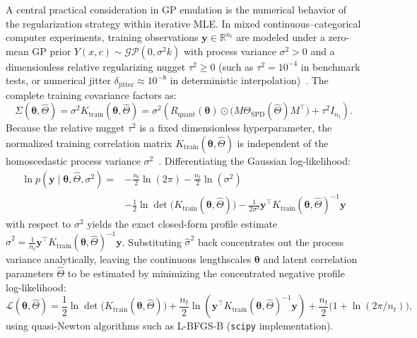 \documentclass[default,sn-mathphys,Numbered]{sn-jnl}
\theoremstyle{thmstyleone}
\theoremstyle{thmstylethree}
\theoremstyle{thmstyletwo}
\begin{document}
A central practical consideration in GP emulation is the numerical behavior of the regularization strategy within iterative MLE. In mixed continuous--categorical computer experiments, training observations $\bm{y} \in \mathbb{R}^{n_t}$ are modeled under a zero-mean GP prior $Y(x, c) \sim \mathcal{GP}(0, \sigma^2 k)$ with process variance $\sigma^2 > 0$ and a dimensionless relative regularizing nugget $\tau^2 \ge 0$ (such as $\tau^2 = 10^{-4}$ in benchmark tests, or numerical jitter $\delta_{\mathrm{jitter}} \approx 10^{-8}$ in deterministic interpolation)~\citep{Jones98}. The complete training covariance factors as:
\begin{equation}
\Sigma(\bm{\theta}, \hat{\Theta}) =  \sigma^2 K_{\mathrm{train}}(\bm{\theta}, \hat{\Theta}) = \sigma^2 \left( R_{\mathrm{quant}}(\bm{\theta}) \odot \bigl(M \Theta_{\mathrm{SPD}}(\hat{\Theta}) M^\top\bigr) + \tau^2 I_{n_t} \right) .
\end{equation}
Because the relative nugget $\tau^2$ is a fixed dimensionless hyperparameter, the normalized training correlation matrix $K_{\mathrm{train}}(\bm{\theta}, \hat{\Theta})$ is independent of the homoscedastic process variance $\sigma^2$~\citep{Jones98}. Differentiating the Gaussian log-likelihood:
\begin{equation}
\begin{split}
\ln p(\bm{y} \mid \bm{\theta}, \hat{\Theta}, \sigma^2) = &-\frac{n_t}{2}\ln(2\pi) - \frac{n_t}{2}\ln(\sigma^2) \\
&- \frac{1}{2}\ln\det\bigl(K_{\mathrm{train}}(\bm{\theta}, \hat{\Theta})\bigr) - \frac{1}{2\sigma^2}\bm{y}^\top K_{\mathrm{train}}(\bm{\theta}, \hat{\Theta})^{-1}\bm{y}
\end{split}
\end{equation}
with respect to $\sigma^2$ yields the exact closed-form profile estimate $\hat{\sigma}^2 = \frac{1}{n_t} \bm{y}^\top K_{\mathrm{train}}(\bm{\theta}, \hat{\Theta})^{-1} \bm{y}$. Substituting $\hat{\sigma}^2$ back concentrates out the process variance analytically, leaving the continuous lengthscales $\bm{\theta}$ and latent correlation parameters $\hat{\Theta}$ to be estimated by minimizing the concentrated negative profile log-likelihood:
\begin{equation}
\label{eq:neg_log_lik}
\mathcal{L}(\bm{\theta}, \hat{\Theta}) = \frac{1}{2} \ln \det\bigl(K_{\mathrm{train}}(\bm{\theta}, \hat{\Theta})\bigr) + \frac{n_t}{2} \ln\left( \bm{y}^\top K_{\mathrm{train}}(\bm{\theta}, \hat{\Theta})^{-1} \bm{y} \right) + \frac{n_t}{2}\bigl(1 + \ln(2\pi / n_t)\bigr),
\end{equation}
using quasi-Newton algorithms such as L-BFGS-B \citep{byrd1995limited} (\texttt{scipy} implementation).
\end{document}
